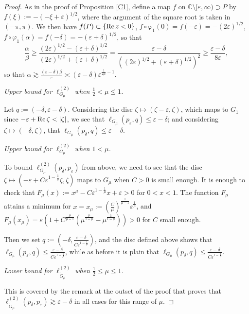 \documentclass[a4paper,12pt]{amsart}
\def\C{\mathbb C}
\renewcommand{\Re}{\operatorname{\rm{Re}}}
\newcommand{\eps}{\varepsilon}
\begin{document}
\begin{proof}
As in the proof of Proposition \ref{C1}, define a map $f$ on $\C\setminus  [\eps,\infty) \supset P$
by $f(\xi):=-(-\xi+\eps)^{1/2}$,
where the argument of the square root is taken in $(-\pi,\pi)$.
We then have $f(P)\subset \{\Re z <0\}$,
$f\circ \varphi_1 (0) = f(-\eps)= - (2\eps)^{1/2}$,
$f\circ \varphi_1 (\alpha) = f(-\delta)= - (\eps+\delta)^{1/2}$,
so that
\[
\frac{\alpha}{\beta} \ge
\frac{(2\eps)^{1/2}-(\eps+\delta)^{1/2}}{(2\eps)^{1/2}+(\eps+\delta)^{1/2}}
=
\frac{\eps-\delta}{((2\eps)^{1/2}+(\eps+\delta)^{1/2})^2}
\ge
\frac{\eps-\delta}{8\eps},
\]
so that $\alpha \gtrsim \frac{(\eps-\delta)\beta}{\eps}\asymp(\eps-\delta) \eps^{\frac1{2\mu}-1}$.
\smallskip

{\it Upper bound for $\ell_{G_\mu}^{(2)}$ when $\frac12 < \mu \le 1$.}

Let $q:=(-\delta, \eps-\delta)$.
Considering the disc $\zeta \mapsto (\zeta - \eps, \zeta)$,
which maps to $G_1$ since $-\eps + \Re \zeta < |\zeta|$,
we see that $\ell_{G_\mu}(p_\eps, q)\le \eps-\delta $;
and considering $\zeta \mapsto (-\delta, \zeta)$, that
$\ell_{G_\mu}(p_\delta, q)\le \eps-\delta $.

\smallskip


{\it Upper bound for $\ell_{G_\mu}^{(2)}$ when $1< \mu $.}

To bound
$\ell_{G_\mu}^{(2)}(p_\delta, p_\eps)$ from above,
we need to see that the disc
$\zeta \mapsto (- \eps+ C \eps^{1-\frac1\mu}\zeta , \zeta)$
maps to $G_\mu$ when $C>0$ is small enough.
It is enough to check that $F_\mu(x) := x^\mu - C \eps^{1-\frac1\mu}x+\eps >0$ for $0<x<1$. The function $F_\mu$
attains a minimum for
$x=x_\mu:= \left(\frac{C}{\mu}\right)^{\frac{1}{\mu-1}}\eps^{\frac{1}{\mu}}$,
and $F_\mu(x_\mu)= \eps(1+ C^\frac{\mu}{\mu-1}(\mu^\frac{\mu}{1-\mu}-\mu^\frac{1}{1-\mu}))>0$ for $C$ small enough.

Then we set $q:=(-\delta, \frac{\eps-\delta}{C \eps^{1-\frac1\mu}})$,
and the disc defined above shows that
$\ell_{G_\mu}(p_\eps, q)\le \frac{\eps-\delta}{C \eps^{1-\frac1\mu}} $,
while as before it is plain that
$\ell_{G_\mu}(p_\delta, q)\le \frac{\eps-\delta}{C \eps^{1-\frac1\mu}}$.
\smallskip

{\it Lower bound for $\ell_{\tilde G_\mu}^{(2)}$ when $\frac12 \le \mu \le 1$.}

This is covered by the remark at the outset of the proof that proves that $\ell_{\tilde G_\mu}^{(2)}(p_\delta, p_\eps) \gtrsim \eps-\delta$
in all cases for this range of $\mu$.


\end{proof}
\end{document}
